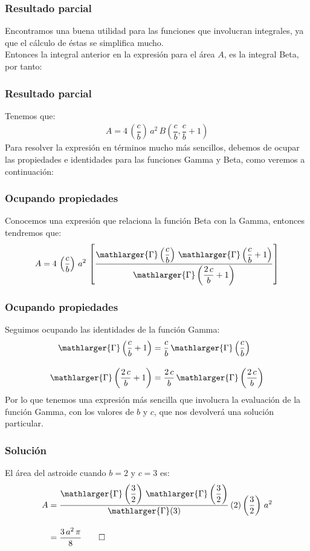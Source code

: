\begin{frame}
\frametitle{Resultado parcial}
Encontramos una buena utilidad para las funciones que involucran integrales, ya que el cálculo de éstas se simplifica mucho.
\\
\bigskip
\pause
Entonces la integral anterior en la expresión para el área $A$, es la integral Beta, por tanto:
\end{frame}
\begin{frame}
\frametitle{Resultado parcial}
Tenemos que:
\begin{align*}
A = 4 \, \left( \dfrac{c}{b} \right) \, a^{2} \, B \left( \dfrac{c}{b}, \dfrac{c}{b} + 1 \right)
\end{align*}
\pause
Para resolver la expresión en términos mucho más sencillos, debemos de ocupar las propiedades e identidades para las funciones Gamma y Beta, como veremos a continuación:
\end{frame}
\begin{frame}
\frametitle{Ocupando propiedades}
Conocemos una expresión que relaciona la función Beta con la Gamma, entonces tendremos que:
\begin{align*}
A = 4 \, \left( \dfrac{c}{b} \right) \, a^{2} \, \left[ \dfrac{\mathlarger{\Gamma} \left( \dfrac{c}{b} \right) \, \mathlarger{\Gamma} \left( \dfrac{c}{b} + 1 \right)}{\mathlarger{\Gamma} \left( \dfrac{2 \, c}{b} + 1 \right)} \right]
\end{align*}
\end{frame}
\begin{frame}
\frametitle{Ocupando propiedades}
Seguimos ocupando las identidades de la función Gamma:
\begin{align*}
\mathlarger{\Gamma} \left( \dfrac{c}{b} + 1 \right) &= \dfrac{c}{b} \, \mathlarger{\Gamma} \left( \dfrac{c}{b} \right) \\[1em]
\mathlarger{\Gamma} \left( \dfrac{2 \, c}{b} + 1 \right) &= \dfrac{2 \, c}{b} \, \mathlarger{\Gamma} \left( \dfrac{2 \, c}{b} \right)
\end{align*}
\pause
Por lo que tenemos una expresión más sencilla que involucra la evaluación de la función Gamma, con los valores de $b$ y $c$, que nos devolverá una solución particular.
\end{frame}
\begin{frame}
\frametitle{Solución}
El área del astroide cuando $b = 2$ y $c = 3$ es:
\begin{align*}
A &= \dfrac{\mathlarger{\Gamma} \left( \dfrac{3}{2} \right) \, \mathlarger{\Gamma} \left( \dfrac{3}{2} \right)}{\mathlarger{\Gamma} (3)} \, (2) \left( \dfrac{3}{2} \right) \, a^{2} \\[1em]
&= \dfrac{3 \, a^{2} \, \pi}{8} \qed
\end{align*}
\end{frame}
